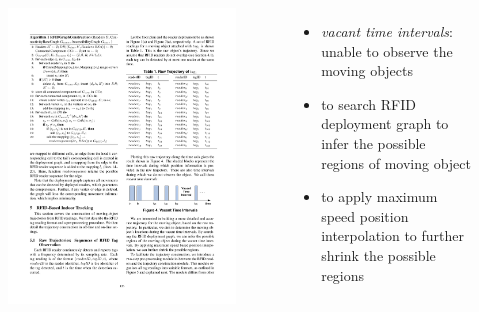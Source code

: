 \begin{frame}
\begin{columns}[c]
    \begin{figure}[tb]
      \includegraphics[width=\columnwidth]{figures/2-1-7.pdf}
    \end{figure}

    \vspace{-15pt}
    \scriptsize{
      \begin{itemize}
        \item \emph{vacant time intervals}: unable to observe the moving objects \pause
        \item to search RFID deployment graph to infer the possible regions of moving object \pause
        \item to apply maximum speed position interpolation to further shrink the possible regions
      \end{itemize}
    }

  \end{columns}

\end{frame}

